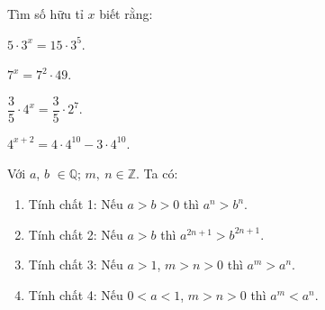 \begin{vd}
	Tìm số hữu tỉ $ x $ biết rằng:
	\begin{listEX}[4]
		\item $ 5\cdot 3^x = 15 \cdot 3^5 $.
		\item 	$ 7^x = 7^2 \cdot 49 $.
		\item $ \dfrac{3}{5} \cdot 4^x = \dfrac{3}{5} \cdot 2^7 $.
		\item $ 4^{x+2}=4\cdot 4^{10} - 3 \cdot 4^{10} $.
			\end{listEX}
\end{vd}
\begin{dang}
	Với $ a $, $ b $ $ \in \mathbb{Q} $; $ m, \ n \in \mathbb{Z} $. Ta có:
	\begin{enumerate}[\tickEX]
	\item  Tính chất 1:  Nếu $a>b>0 $ thì $ a^n > b^n. $
	\item Tính chất 2:  Nếu $ a>b $ thì $ a^{2n+1}>b^{2n+1} $.
	\item Tính chất 3:  Nếu $ a>1 $, $ m>n>0 $ thì $ a^{m}>a^{n} $.
	\item Tính chất 4:  Nếu $ 0<a<1 $, $ m>n>0 $ thì $ a^{m}<a^{n} $. 
	\end{enumerate}
\end{dang}
